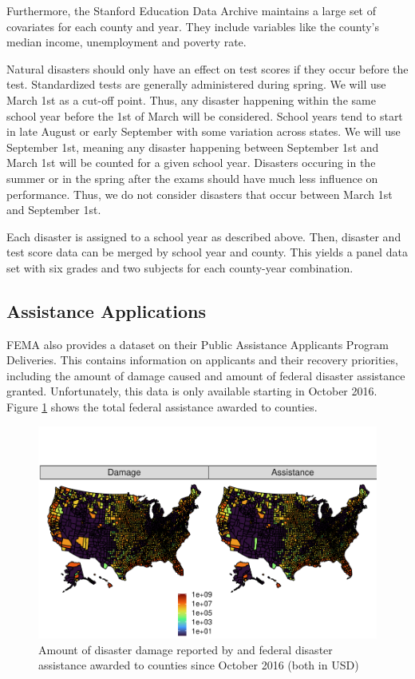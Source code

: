 Furthermore, the Stanford Education Data Archive maintains a large set of covariates for each county and year. They include variables like the county's median income, unemployment and poverty rate.

Natural disasters should only have an effect on test scores if they occur before the test. Standardized tests are generally administered during spring. We will use March 1st as a cut-off point. Thus, any disaster happening within the same school year before the 1st of March will be considered. School years tend to start in late August or early September with some variation across states. We will use September 1st, meaning any disaster happening between September 1st and March 1st will be counted for a given school year. Disasters occuring in the summer or in the spring after the exams should have much less influence on performance. Thus, we do not consider disasters that occur between March 1st and September 1st.

Each disaster is assigned to a school year as described above. Then, disaster and test score data can be merged by school year and county. This yields a panel data set with six grades and two subjects for each county-year combination.


\subsection{Assistance Applications}


FEMA also provides a dataset on  their Public Assistance Applicants Program Deliveries. This contains information on applicants and their recovery priorities, including the amount of damage caused and amount of federal disaster assistance granted. Unfortunately, this data is only available starting in October 2016. Figure \ref{AssistanceMap} shows the total federal assistance awarded to counties.

\begin{figure}[!h]
	\centering
	\includegraphics[scale=1]{"../Code & Data/AssistanceMap.pdf"}
	\caption{Amount of disaster damage reported by and federal disaster assistance awarded to counties since October 2016 (both in USD)}
	\label{AssistanceMap}
\end{figure}


